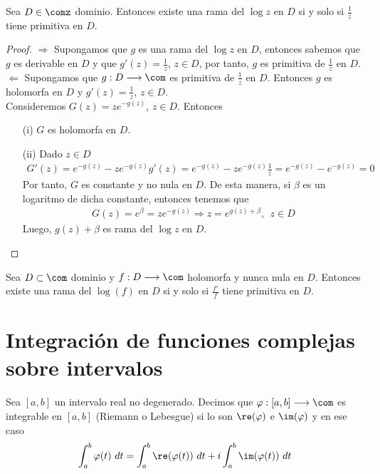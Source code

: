 \begin{prop}
Sea $D \in \comz$ dominio. Entonces existe una rama del $\log z$ en $D$ si y solo si $\frac{1}{z}$ tiene primitiva en $D$.
\end{prop}

\begin{proof}
$\boxed{\Longrightarrow}$ Supongamos que $g$ es una rama del $\log z$ en $D$, entonces sabemos que $g$ es derivable en $D$ y que $g'(z) = \frac{1}{z}$, $z \in D$, por tanto, $g$ es primitiva de $\frac{1}{z}$ en $D$.
\\
\newline
$\boxed{\Longleftarrow}$ Supongamos que $g: D \longrightarrow \com$ es primitiva de $\frac{1}{z}$ en $D$. Entonces $g$ es holomorfa en $D$ y $g'(z) = \frac{1}{z}$, $z \in D$.
\\
\newline
Consideremos $G(z) = ze^{-g(z)}$, $z \in D$. Entonces
\begin{enumerate}
    \item[(i)] $G$ es holomorfa en $D$.
    \item[(ii)] Dado $z \in D$
    \begin{align*}
        G'(z) = e^{-g(z)} - ze^{-g(z)}g'(z) = e^{-g(z)} - ze^{-g(z)} \frac{1}{z}= e^{-g(z)} - e^{-g(z)} = 0
    \end{align*}
    Por tanto, $G$ es constante y no nula en $D$. De esta manera, si $\beta$ es un logaritmo de dicha constante, entonces tenemos que
    \begin{align*}
        G(z) = e^{\beta} = ze^{-g(z)} \Longrightarrow  z = e^{g(z) + \beta}, \ \ z \in D
    \end{align*}
    Luego, $g(z) + \beta$ es rama del $\log z$ en $D$.
\end{enumerate}
\end{proof}

\begin{prop}
Sea $D \subset \com$ dominio y $f: D \longrightarrow \com$ holomorfa y nunca nula en $D$. Entonces existe una rama del $\log (f)$ en $D$ si y solo si $\frac{f'}{f}$ tiene primitiva en $D$.
\end{prop}

\section{Integración de funciones complejas sobre intervalos}

\begin{defi}
Sea $[a,b]$ un intervalo real no degenerado. Decimos que $\varphi : [a,b] \longrightarrow \com$ es integrable en $[a,b]$ (Riemann o Lebesgue) si lo son $\re(\varphi)$ e $\im(\varphi)$ y en ese caso
\begin{align*}
    \int_{a}^{b}{\varphi(t) \ dt} = \int_{a}^{b}{\re(\varphi(t)) \ dt} + i\int_{a}^{b}{\im(\varphi(t)) \ dt} 
\end{align*}
\end{defi}

